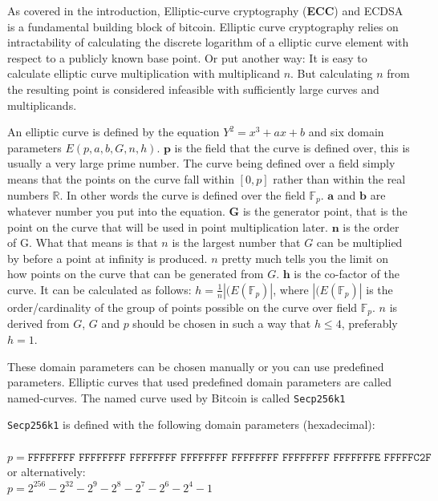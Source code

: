 
\label{ecdsa}
As covered in the introduction, Elliptic-curve cryptography (\textbf{ECC}) and ECDSA 
is a fundamental building block of bitcoin. Elliptic curve cryptography relies on 
intractability of calculating the discrete logarithm of a elliptic curve element with 
respect to a publicly known base point. Or put another way: It is easy to calculate 
elliptic curve multiplication with multiplicand $n$. But calculating $n$ from the 
resulting point is considered infeasible with sufficiently large curves and multiplicands.

An elliptic curve is defined by the equation $Y^2=x^3+ax+b$ and six domain parameters 
$E(p,a,b,G,n,h)$. $\textbf{p}$ is the field that the curve is defined over, this 
is usually a very large prime number. The curve being defined over a field simply 
means that the points on the curve fall within $[0, p]$ rather than within the 
real numbers $\mathbb{R}$. In other words the curve is defined over the field 
$\mathbb{F}_{p}$. $\textbf{a}$ and $\textbf{b}$ are whatever number you put into 
the equation. $\textbf{G}$ is the generator point, that is the point on the curve 
that will be used in point multiplication later. $\textbf{n}$ is the order of G. What 
that means is that $n$ is the largest number that $G$ can be multiplied by before 
a point at infinity is produced. $n$ pretty much tells you the limit on how points 
on the curve that can be generated from $G$. $\textbf{h}$ is the co-factor of the 
curve. It can be calculated as follows: $h=\frac{1}{n}|(E(\mathbb{F}_{p})|$, where 
$|(E(\mathbb{F}_{p})|$ is the order/cardinality of the group of points possible on 
the curve over field $\mathbb{F}_{p}$. $n$ is derived from $G$, $G$ and $p$ should 
be chosen in such a way that $h \leq 4$, preferably $h=1$.

These domain parameters can be chosen manually or you can use predefined parameters. 
Elliptic curves that used predefined domain parameters are called named-curves. 
The named curve used by Bitcoin is called \texttt{Secp256k1}

\texttt{Secp256k1} is defined with the following domain parameters (hexadecimal):\\\\
$p=\texttt{FFFFFFFF FFFFFFFF FFFFFFFF FFFFFFFF FFFFFFFF FFFFFFFF FFFFFFFE FFFFFC2F}$\\
or alternatively:\\
$p=2^{256}-2^{32}-2^{9}-2^{8}-2^{7}-2^{6}-2^{4}-1$


